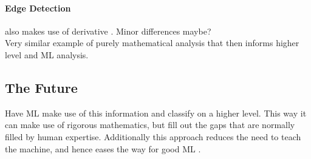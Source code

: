 \documentclass[main.tex]{subfiles}
\begin{document}
        \paragraph{Edge Detection} %
          also makes use of derivative \cite{}. Minor differences maybe? \\
          Very similar example of purely mathematical analysis that then informs higher level and ML analysis.
    
    \subsection{The Future}
      
      Have ML make use of this information and classify on a higher level. This way it can make use of rigorous mathematics, but fill out the gaps that are normally filled by human expertise. Additionally this approach reduces the need to teach the machine, and hence eases the way for good ML \cite{}.
  
\end{document}
